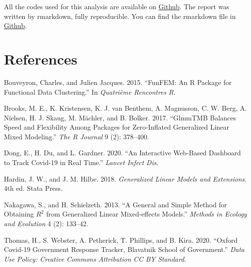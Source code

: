 \documentclass[
  6pt,
]{article}
\newlength{\cslhangindent}
\newenvironment{cslreferences}%
  {\setlength{\parindent}{0pt}%
  \everypar{\setlength{\hangindent}{\cslhangindent}}\ignorespaces}%
  {\par}
\begin{document}
All the codes used for this analysis are available on
\href{https://github.com/angeella/Lockdown_policies_COVID19}{Github}.
The report was written by rmarkdown, fully reproducible. You can find
the rmarkdown file in
\href{https://github.com/angeella/Lockdown_policies_COVID19/Report}{Github}.

\hypertarget{references}{%
\section*{References}\label{references}}

\hypertarget{refs}{}
\begin{cslreferences}
\leavevmode\hypertarget{ref-funfem}{}%
Bouveyron, Charles, and Julien Jacques. 2015. ``FunFEM: An R Package for
Functional Data Clustering.'' In \emph{Quatrième Rencontres R}.

\leavevmode\hypertarget{ref-glmmTMB}{}%
Brooks, M. E., K. Kristensen, K. J. van Benthem, A. Magnusson, C. W.
Berg, A. Nielsen, H. J. Skaug, M. Mächler, and B. Bolker. 2017.
``GlmmTMB Balances Speed and Flexibility Among Packages for
Zero-Inflated Generalized Linear Mixed Modeling.'' \emph{The R Journal}
9 (2): 378--400.

\leavevmode\hypertarget{ref-Jhon}{}%
Dong, E., H. Du, and L. Gardner. 2020. ``An Interactive Web-Based
Dashboard to Track Covid-19 in Real Time.'' \emph{Lancet Infect Dis}.

\leavevmode\hypertarget{ref-Hardin}{}%
Hardin, J. W., and J. M. Hilbe. 2018. \emph{Generalized Linear Models
and Extensions}. 4th ed. Stata Press.

\leavevmode\hypertarget{ref-Nakagawa}{}%
Nakagawa, S., and H. Schielzeth. 2013. ``A General and Simple Method for
Obtaining \(R^2\) from Generalized Linear Mixed‐effects Models.''
\emph{Methods in Ecology and Evolution} 4 (2): 133--42.

\leavevmode\hypertarget{ref-Oxford}{}%
Thomas, H., S. Webster, A. Petherick, T. Phillips, and B. Kira. 2020.
``Oxford Covid-19 Government Response Tracker, Blavatnik School of
Government.'' \emph{Data Use Policy: Creative Commons Attribution CC BY
Standard}.
\end{cslreferences}
\end{document}
